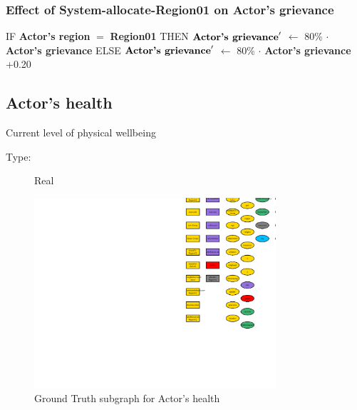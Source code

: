 \documentclass{article}%
\begin{document}
%
\subsubsection{Effect of System{-}allocate{-}Region01 on Actor's grievance}%
\label{ssubsec:Effect of System{-}allocate{-}Region01 on Actor's grievance}%
\begin{flushleft}%
IF %
\textbf{Actor's region}%
$=$%
\textbf{Region01}%
\linebreak%
\hspace*{2em}%
THEN %
$\mbox{\textbf{Actor's grievance}} '$%
$\leftarrow$%
80\%%
$\cdot$%
\textbf{Actor's grievance}%
\linebreak%
\hspace*{2em}%
ELSE %
$\mbox{\textbf{Actor's grievance}} '$%
$\leftarrow$%
80\%%
$\cdot$%
\textbf{Actor's grievance}%
+0.20%
\end{flushleft}

%
\subsection{Actor's health}%
\label{subsec:Actor's health}%
Current level of physical wellbeing%
\begin{description}%
\item[Type:]%
Real%
\end{description}%


\begin{figure}[ht]%
\centering%
\includegraphics[width=0.8\textwidth]{images/healthOfActor.png}%
\caption{Ground Truth subgraph for Actor's health}%
\end{figure}

%
\end{document}
